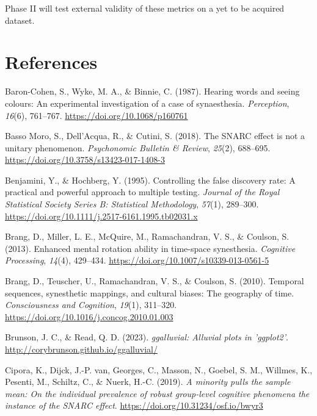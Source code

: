 \documentclass[
  man,
  floatsintext,
  longtable,
  nolmodern,
  notxfonts,
  notimes,
  colorlinks=true,linkcolor=blue,citecolor=blue,urlcolor=blue]{apa7}
\newlength{\cslhangindent}
\newenvironment{CSLReferences}[2] %
 {\begin{list}{}{%
  \setlength{\itemindent}{0pt}
  \setlength{\leftmargin}{0pt}
  \setlength{\parsep}{0pt}
  \ifodd #1
   \setlength{\leftmargin}{\cslhangindent}
   \setlength{\itemindent}{-1\cslhangindent}
  \fi
  \setlength{\itemsep}{#2\baselineskip}}}
 {\end{list}}
\begin{document}
Phase II will test external validity of these metrics on a yet to be
acquired dataset.

\section{References}\label{references}

\protect{}\label{refs}
\begin{CSLReferences}{1}{0}
Baron-Cohen, S., Wyke, M. A., \& Binnie, C. (1987). Hearing words and
seeing colours: An experimental investigation of a case of synaesthesia.
\emph{Perception}, \emph{16}(6), 761--767.
\url{https://doi.org/10.1068/p160761}

Basso Moro, S., Dell'Acqua, R., \& Cutini, S. (2018). The SNARC effect
is not a unitary phenomenon. \emph{Psychonomic Bulletin \& Review},
\emph{25}(2), 688--695. \url{https://doi.org/10.3758/s13423-017-1408-3}

Benjamini, Y., \& Hochberg, Y. (1995). Controlling the false discovery
rate: A practical and powerful approach to multiple testing.
\emph{Journal of the Royal Statistical Society Series B: Statistical
Methodology}, \emph{57}(1), 289--300.
\url{https://doi.org/10.1111/j.2517-6161.1995.tb02031.x}

Brang, D., Miller, L. E., McQuire, M., Ramachandran, V. S., \& Coulson,
S. (2013). Enhanced mental rotation ability in time-space synesthesia.
\emph{Cognitive Processing}, \emph{14}(4), 429--434.
\url{https://doi.org/10.1007/s10339-013-0561-5}

Brang, D., Teuscher, U., Ramachandran, V. S., \& Coulson, S. (2010).
Temporal sequences, synesthetic mappings, and cultural biases: The
geography of time. \emph{Consciousness and Cognition}, \emph{19}(1),
311--320. \url{https://doi.org/10.1016/j.concog.2010.01.003}

Brunson, J. C., \& Read, Q. D. (2023). \emph{{ggalluvial}: Alluvial
plots in 'ggplot2'}. \url{http://corybrunson.github.io/ggalluvial/}

Cipora, K., Dijck, J.-P. van, Georges, C., Masson, N., Goebel, S. M.,
Willmes, K., Pesenti, M., Schiltz, C., \& Nuerk, H.-C. (2019). \emph{A
minority pulls the sample mean: On the individual prevalence of robust
group-level cognitive phenomena {\textendash} the instance of the SNARC
effect}. \url{https://doi.org/10.31234/osf.io/bwyr3}


\end{CSLReferences}
\end{document}
